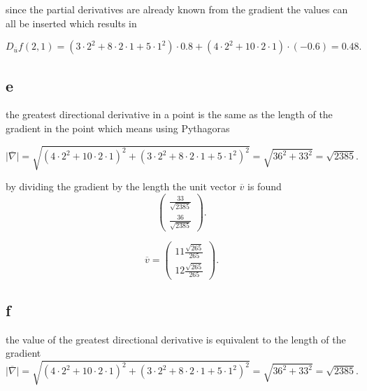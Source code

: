 \documentclass[12pt,a4paper]{article}
\begin{document}
since the partial derivatives are already known from the gradient the values can all be inserted which results in

\[
	D_{\overline{u}}f(2,1)=(3\cdot 2^2 + 8\cdot 2\cdot 1 + 5\cdot 1^2)\cdot 0.8+( 4\cdot 2^2 + 10\cdot 2\cdot 1)\cdot  (-0.6)=0.48
.\] 



\subsection{e}

the greatest directional derivative in a point is the same as the length of the gradient in the point which means using Pythagoras 

\[
 \mid \overline{\nabla } \mid = \sqrt{\left(4\cdot 2^{2} + 10 \cdot 2\cdot  1\right)^{2} + \left(3 \cdot 2^{2} + 8\cdot 2\cdot 1 + 5\cdot  1^{2}\right)^{2}}=\sqrt{36^2+33^2}=\sqrt{2385}  
.\] 

by dividing the gradient by the length the unit vector $\overline{v}$ is found \[
\begin{pmatrix} \frac{33}{ \sqrt{2385}}\\ \frac{36}{ \sqrt{2385}} \end{pmatrix}
.\] 

\[
\overline{v}= \begin{pmatrix} 11\frac{\sqrt{265}}{265}\\
12\frac{\sqrt{265}}{265} \end{pmatrix}
.\] 

\subsection{f} 

the value of the greatest directional derivative is equivalent to the length of the gradient
\[
  \mid \overline{\nabla } \mid = \sqrt{\left(4\cdot 2^{2} + 10 \cdot 2\cdot  1\right)^{2} + \left    (3 \cdot 2^{2} + 8\cdot 2\cdot 1 + 5\cdot  1^{2}\right)^{2}}=\sqrt{36^2+33^2}=\sqrt{2385} 
.\] 
\end{document}
